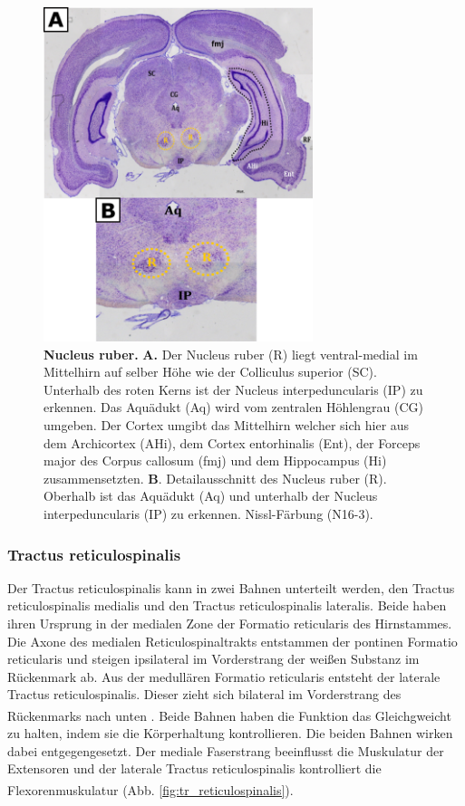 \documentclass[12pt,a4paper,pdftex]{article}
\begin{document}
\begin{figure}[H]
    \centering
    \includegraphics[width=0.7\textwidth]{pictures/Bilder_Laura/red_nucleus_N16_3P_025x.png}
    \caption[Nucleus ruber]{\textbf{Nucleus ruber.} \textbf{A.} Der Nucleus ruber (R) liegt ventral-medial im Mittelhirn auf selber Höhe wie der Colliculus superior (SC). Unterhalb des roten Kerns ist der Nucleus interpeduncularis (IP) zu erkennen. Das Aquädukt (Aq) wird vom zentralen Höhlengrau (CG) umgeben. Der Cortex umgibt das Mittelhirn welcher sich hier aus dem  Archicortex (AHi), dem Cortex entorhinalis (Ent), der Forceps major des Corpus callosum (fmj) und dem Hippocampus (Hi) zusammensetzten. \textbf{B}. Detailausschnitt des Nucleus ruber (R). Oberhalb ist das Aquädukt (Aq) und unterhalb der Nucleus interpeduncularis (IP) zu erkennen. Nissl-Färbung (N16-3).}
    \label{fig:roter_Kern}
\end{figure}

\subsubsection{Tractus reticulospinalis} 
Der Tractus reticulospinalis kann in zwei Bahnen unterteilt werden, den Tractus reticulospinalis medialis und den Tractus reticulospinalis lateralis. Beide haben ihren Ursprung in der medialen Zone der Formatio reticularis des Hirnstammes. Die Axone des medialen Reticulospinaltrakts entstammen der pontinen Formatio reticularis und steigen ipsilateral im Vorderstrang der weißen Substanz im Rückenmark ab. Aus der medullären Formatio reticularis entsteht der laterale Tractus reticulospinalis. Dieser zieht sich bilateral im Vorderstrang des Rückenmarks nach unten \textsuperscript{\cite[8]{crossman2014neuroanatomy}}. Beide Bahnen haben die Funktion das Gleichgweicht zu halten, indem sie die Körperhaltung kontrollieren. Die beiden Bahnen wirken dabei entgegengesetzt. Der mediale Faserstrang beeinflusst die Muskulatur der Extensoren und der laterale Tractus reticulospinalis kontrolliert die Flexorenmuskulatur \textsuperscript{\cite[14]{neurowissenschaften_baer}}(Abb. \ref{fig:tr_reticulospinalis}).
\end{document}
